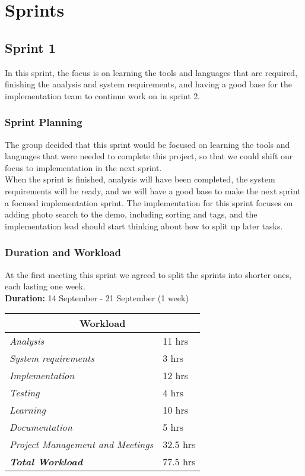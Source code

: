 \chapter{Sprints}

\newpage

\section{Sprint 1}
In this sprint, the focus is on learning the tools and languages that are required, finishing the analysis and system requirements, and having a good base for the implementation team to continue work on in sprint 2.

\subsection{Sprint Planning}
The group decided that this sprint would be focused on learning the tools and languages that were needed to complete this project, so that we could shift our focus to implementation in the next sprint. \\
\indent When the sprint is finished, analysis will have been completed, the system requirements will be ready, and we will have a good base to make the next sprint a focused implementation sprint. The implementation for this sprint focuses on adding photo search to the demo, including sorting and tags, and the implementation lead should start thinking about how to split up later tasks.

\subsection{Duration and Workload}
At the first meeting this sprint we agreed to split the sprints into shorter ones, each lasting one week. \\

\noindent \textbf{Duration: } 14 September - 21 September (1 week)\\
\begin{minipage}{\linewidth}
\setlength{\tabcolsep}{25pt}
\centering
{}
\begin{tabular}{ |l|l| }
	\hline
	\multicolumn{2}{|c|}{\cellcolor{gray!25} Workload} \\
	\hline
	\it{Analysis} & 11 hrs\\
	\it{System requirements} & 3 hrs\\
	\it{Implementation} & 12 hrs\\
	\it{Testing} & 4 hrs\\
	\it{Learning} & 10 hrs\\
	\it{Documentation} & 5 hrs\\
	\it{Project Management and Meetings} & 32.5 hrs\\
	\hline
	\textbf{\textit{Total Workload}} & 77.5 hrs\\
	\hline
\end{tabular}
\end{minipage}

